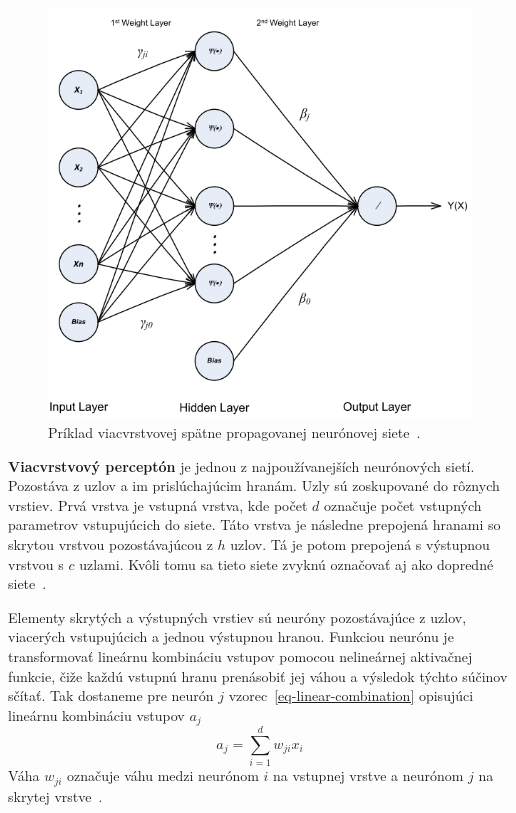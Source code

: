\documentclass[a4paper,slovak,12pt,appendix]{article}
\begin{document}
\begin{figure}[!ht]
  \centering
	\captionsetup{justification=centering}
  \includegraphics[width=\textwidth]{neural_network.png}
  \caption[Príklad viacvrstvovej spätne propagovanej neurónovej siete.]{Príklad viacvrstvovej spätne propagovanej neurónovej siete~\cite{Kennedy2002}.}
  \label{fig-neural-network}
\end{figure}

\textbf{Viacvrstvový perceptón} je jednou z najpoužívanejších neurónových
sietí. Pozostáva z uzlov a im prislúchajúcim hranám. Uzly sú zoskupované do
rôznych vrstiev. Prvá vrstva je vstupná vrstva, kde počet $d$ označuje počet
vstupných parametrov vstupujúcich do siete. Táto vrstva je následne prepojená
hranami so skrytou vrstvou pozostávajúcou z $h$ uzlov. Tá je potom prepojená
s výstupnou vrstvou s $c$ uzlami. Kvôli tomu sa tieto siete zvyknú označovať aj
ako dopredné siete~\cite{Merz1998}.

Elementy skrytých a výstupných vrstiev sú neuróny pozostávajúce z uzlov,
viacerých vstupujúcich a jednou výstupnou hranou. Funkciou neurónu je
transformovať lineárnu kombináciu vstupov pomocou nelineárnej aktivačnej
funkcie, čiže každú vstupnú hranu prenásobiť jej váhou a výsledok týchto súčinov
sčítať. Tak dostaneme pre neurón $j$ vzorec~\ref{eq-linear-combination}
opisujúci lineárnu kombináciu vstupov $a_j$
\begin{equation}
  a_j = \sum_{i=1}^{d} w_{ji} x_i
  \label{eq-linear-combination}
\end{equation}
Váha $w_{ji}$ označuje váhu medzi neurónom $i$ na vstupnej vrstve
a neurónom $j$ na skrytej vrstve~\cite{Merz1998}.
\end{document}
